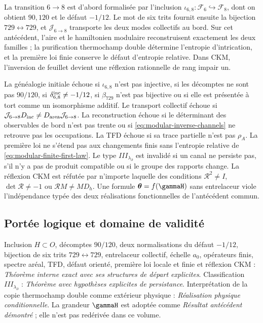 \begin{proposition}
La transition \(6\to8\) est d'abord formalisée par l'inclusion
\(\iota_{6,8}:\mathcal F_6\hookrightarrow\mathcal F_8\), dont on
obtient
\(90,120\) et le défaut \(-1/12\). Le mot de six trits fournit
ensuite la bijection \(729\leftrightarrow729\), et
\(\mathcal J_{6\to8}\) transporte les deux modes collectifs au bord. Sur
cet antécédent, l'aire et le hamiltonien modulaire reconstruisent exactement
les deux familles ; la purification thermochamp double détermine l'entropie
d'intrication, et la première loi
finie conserve le défaut d'entropie relative. Dans CKM, l'inversion de
feuillet devient une réflexion rationnelle de rang impair un.
\end{proposition}

\begin{remark}
La généalogie initiale échoue si \(\iota_{6,8}\) n'est pas injective, si les
décomptes ne sont pas \(90/120\), si \(\delta_{6,8}^{\rm inc}\neq-1/12\), si
\(\beta_{729}\) n'est pas bijective ou si elle est présentée à tort comme un
isomorphisme additif. Le transport collectif échoue si
\(\mathcal J_{6\to8}D_{\rm inc}\neq
D_{\rm area}\mathcal J_{6\to8}\). La reconstruction échoue si le
déterminant des observables de bord n'est pas trente ou si
\cref{eq:modular-inverse-channels} ne retrouve pas les occupations.
La TFD échoue si sa trace partielle n'est pas \(\rho_A\). La première loi ne
s'étend pas aux changements finis sans l'entropie relative de
\cref{eq:modular-finite-first-law}. Le type
\(III_{\lambda_\partial}\) est invalidé si un canal ne persiste pas, s'il n'y a pas de
produit compatible ou si le groupe des rapports change. La réflexion CKM
est réfutée par n'importe laquelle des conditions
\(\mathcal R^2\neq I\), \(\det\mathcal R\neq-1\) ou
\(\mathcal RM\neq MD_h\). Une formule
\(\boldsymbol\theta=f(\gammaH)\) sans entrelaceur viole l'indépendance
typée des deux réalisations fonctionnelles de l'antécédent commun.
\end{remark}

\subsection*{Portée logique et domaine de validité}
Inclusion \(H\subset O\), décomptes \(90/120\), deux normalisations du
défaut \(-1/12\), bijection de six trits \(729\leftrightarrow729\),
entrelaceur collectif, échelle \(a_0\), opérateurs finis, spectre aréal,
TFD, défaut orienté, première loi locale et finie et réflexion CKM :
\emph{Théorème interne exact avec ses structures de départ explicites}.
Classification
\(III_{\lambda_\partial}\) : \emph{Théorème avec hypothèses explicites de
persistance}. Interprétation de la copie thermochamp double comme extérieur physique :
\emph{Réalisation physique conditionnelle}. La grandeur \(\gammaH\) est adoptée
comme \emph{Résultat antécédent démontré} ; elle n'est pas redérivée dans ce volume.

